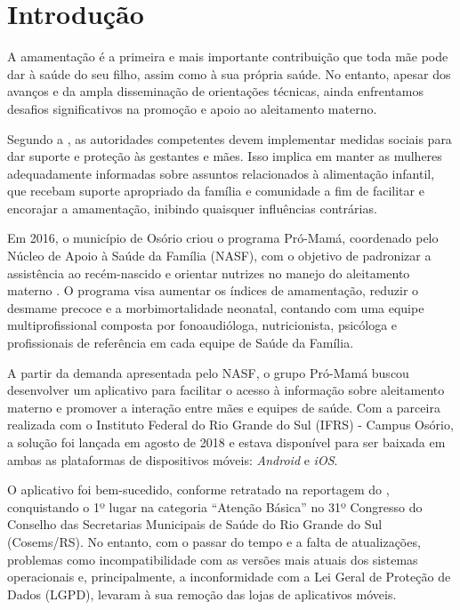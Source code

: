 \chapter{Introdução}

A amamentação é a primeira e mais importante contribuição que toda mãe pode dar à saúde do seu filho, assim como à sua própria saúde. No entanto, apesar dos avanços e da ampla disseminação de orientações técnicas, ainda enfrentamos desafios significativos na promoção e apoio ao aleitamento materno.

Segundo a , as autoridades competentes devem implementar medidas sociais para dar suporte e proteção às gestantes e mães. Isso implica em manter as mulheres adequadamente informadas sobre assuntos relacionados à alimentação infantil, que recebam suporte apropriado da família e comunidade a fim de facilitar e encorajar a amamentação, inibindo quaisquer influências contrárias.

Em 2016, o município de Osório criou o programa Pró-Mamá, coordenado pelo Núcleo de Apoio à Saúde da Família (NASF), com o objetivo de padronizar a assistência ao recém-nascido e orientar nutrizes no manejo do aleitamento materno \cite{planomunicipaloso}. O programa visa aumentar os índices de amamentação, reduzir o desmame precoce e a morbimortalidade neonatal, contando com uma equipe multiprofissional composta por fonoaudióloga, nutricionista, psicóloga e profissionais de referência em cada equipe de Saúde da Família.

A partir da demanda apresentada pelo NASF, o grupo Pró-Mamá buscou desenvolver um aplicativo para facilitar o acesso à informação sobre aleitamento materno e promover a interação entre mães e equipes de saúde. Com a parceira realizada com o Instituto Federal do Rio Grande do Sul (IFRS) - Campus Osório, a solução foi lançada em agosto de 2018 e estava disponível para ser baixada em ambas as plataformas de dispositivos móveis: \emph{Android} e \emph{iOS}.

O aplicativo foi bem-sucedido, conforme retratado na reportagem do , conquistando o 1º lugar na categoria “Atenção Básica” no 31º Congresso do Conselho das Secretarias Municipais de Saúde do Rio Grande do Sul (Cosems/RS). No entanto, com o passar do tempo e a falta de atualizações, problemas como incompatibilidade com as versões mais atuais dos sistemas operacionais e, principalmente, a inconformidade com a Lei Geral de Proteção de Dados (LGPD), levaram à sua remoção das lojas de aplicativos móveis.

